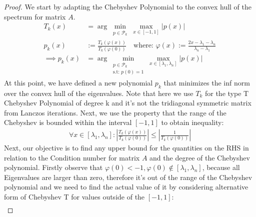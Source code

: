 \documentclass[]{article}
\theoremstyle{definition}
\begin{document}
            \begin{proof}
                We start by adapting the Chebyshev Polynomial to the convex hull of the spectrum for matrix $A$.  
                \begin{align}
                    T_k(x) &= \arg\min_{
                        \substack{
                            p\in \mathcal{P}_{k}
                            }
                        }\max_{x\in [-1, 1]}|p(x)|
                    \\
                    p_k(x) &:= 
                    \frac{T_k(\varphi(x))}{T_k(\varphi(0))}
                    \quad 
                    \text{where: } 
                    \varphi(x) := \frac{2x - \lambda_1 - \lambda_n}{\lambda_n - \lambda_1}
                    \\
                    \implies p_k(x) &= \arg \min_{
                        \substack{
                            p\in \mathcal{P}_{k}
                            \\
                            \text{s.t: } p(0)  = 1
                        }
                    }\max_{x\in [\lambda_1, \lambda_n]}|p(x)|
                \end{align}
                At this point, we have defined a new polynomial $p_k$ that minimizes the inf norm over the convex hull of the eigenvalues. Note that here we use $T_k$ for the type T Chebyshev Polynomial of degree k and it's not the tridiagonal symmetric matrix from Lanczos iterations. Next, we use the property that the range of the Chebyshev is bounded within the interval $[-1, 1]$ to obtain inequality: 
                \begin{align}
                    \forall x \in [\lambda_1, \lambda_n]: \left|
                    \frac{T_k(\varphi(x))}{T_k(\varphi(0))}
                    \right|
                    \le 
                    \left|
                        \frac{1}{T_k(\varphi(0))}
                    \right|
                \end{align}
                Next, our objective is to find any upper bound for the quantities on the RHS in relation to the Condition number for matrix $A$ and the degree of the Chebyshev polynomial. Firstly observe that $\varphi(0) < -1, \varphi(0) \not\in [\lambda_1, \lambda_n]$, because all Eigenvalues are larger than zero, therefore it's out of the range of the Chebyshev polynomial and we need to find the actual value of it by considering alternative form of Chebyshev T for values outside of the $[-1,1]$: 
                \begin{align}

\end{align}
\end{proof}
\end{document}
